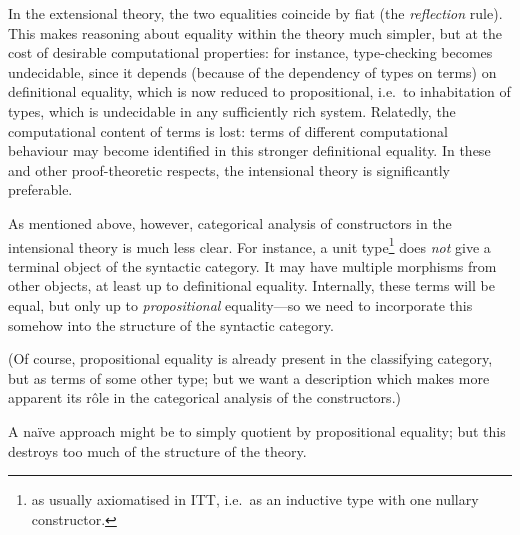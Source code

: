 \begin{para}
In the extensional theory, the two equalities coincide by fiat (the \emph{reflection} rule).  This makes reasoning about equality within the theory much simpler, but at the cost of desirable computational properties: for instance, type-checking becomes undecidable, since it depends (because of the dependency of types on terms) on definitional equality, which is now reduced to propositional, i.e.\ to inhabitation of types, which is undecidable in any sufficiently rich system.  Relatedly, the computational content of terms is lost: terms of different computational behaviour may become identified in this stronger definitional equality.  In these and other proof-theoretic respects, the intensional theory is significantly preferable.

As mentioned above, however, categorical analysis of constructors in the intensional theory is much less clear.  For instance, a unit type\footnote{as usually axiomatised in ITT, i.e.\ as an inductive type with one nullary constructor.} does \emph{not} give a terminal object of the syntactic category.  It may have multiple morphisms from other objects, at least up to definitional equality.  Internally, these terms will be equal, but only up to \emph{propositional} equality---so we need to incorporate this somehow into the structure of the syntactic category.  

(Of course, propositional equality is already present in the classifying category, but as terms of some other type; but we want a description which makes more apparent its rôle in the categorical analysis of the constructors.)

A naïve approach might be to simply quotient by propositional equality; but this destroys too much of the structure of the theory. 
\end{para}

